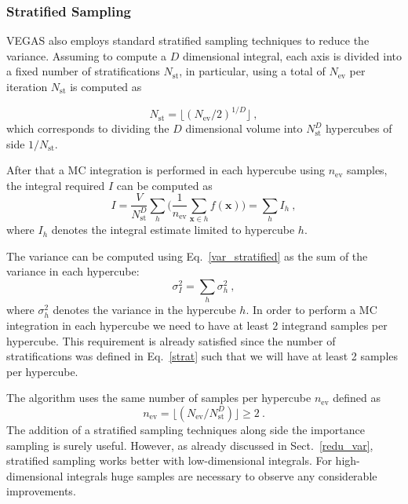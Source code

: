 \documentclass[../main/main.tex]{subfiles}
\begin{document}
\subsubsection{Stratified Sampling}
VEGAS also employs standard stratified sampling techniques to reduce the variance.
Assuming to compute a $D$ dimensional integral, each axis is divided into a fixed number of stratifications $N_\text{st}$, in particular, using a total of $N_{\text{ev}}$ per iteration $N_\text{st}$ is computed as

\begin{equation}
	\label{strat}
	N_\text{st} = \lfloor (N_\text{ev}/2)^{1/D}\rfloor \ ,
\end{equation}
which corresponds to dividing the $D$ dimensional volume into $N_\text{st}^D$ hypercubes of side $1/N_\text{st}$.

After that a MC integration is performed in each hypercube using $n_\text{ev}$ samples, the integral required $I$ can be computed as
\begin{equation}
	\label{i str}
	I = \frac{V}{N_\text{st}^D}\sum_h \bigg(\frac{1}{n_\text{ev}} \sum_{\textbf{x} \in h} f(\textbf{x}) \bigg) = \sum_h I_h \ ,
\end{equation}
where $I_h$ denotes the integral estimate limited to hypercube $h$.

The variance can be computed using Eq.~\ref{var_stratified} as the sum of the variance in each hypercube:
\begin{equation}
	\label{sigma str}
	\sigma^2_I = \sum_h \sigma^2_h \ ,
\end{equation}
where $\sigma^2_h$ denotes the variance in the hypercube $h$.
In order to perform a MC integration in each hypercube we need to have at least $2$ integrand samples per hypercube. This requirement is already satisfied since the number of stratifications was defined in Eq.~\ref{strat} such that we will have at least 2 samples per hypercube. 

The algorithm uses the same number of samples per hypercube $n_\text{ev}$ defined as
\begin{equation}
	n_\text{ev} = \lfloor (N_\text{ev}/N_\text{st}^D)\rfloor \ge 2 \ .
\end{equation} 
The addition of a stratified sampling techniques along side the importance sampling is surely useful.
However, as already discussed in Sect.~\ref{redu_var}, stratified sampling works better with low-dimensional integrals. For 
high-dimensional integrals huge samples are necessary to observe any considerable improvements.
\end{document}
